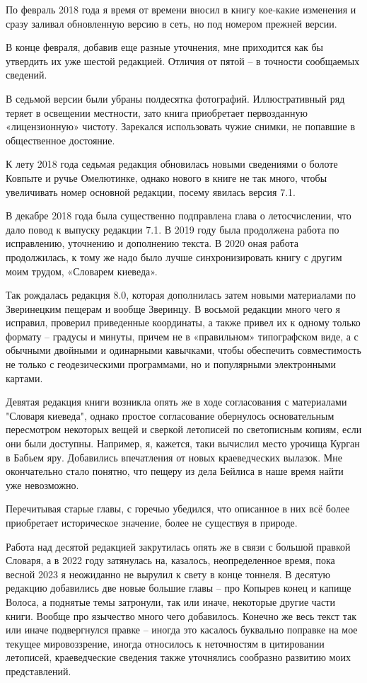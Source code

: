 По февраль 2018 года я время от времени вносил в книгу кое-какие изменения и сразу заливал обновленную версию в сеть, но под номером прежней версии.

В конце февраля, добавив еще разные уточнения, мне приходится как бы утвердить их уже шестой редакцией. Отличия от пятой – в точности сообщаемых сведений. 

В седьмой версии были убраны полдесятка фотографий. Иллюстративный ряд теряет в освещении местности, зато книга приобретает первозданную «лицензионную» чистоту. Зарекался использовать чужие снимки, не попавшие в общественное достояние.

К лету 2018 года седьмая редакция обновилась новыми сведениями о болоте Ковпыте и ручье Омелютинке, однако нового в книге не так много, чтобы увеличивать номер основной редакции, посему явилась версия 7.1.

В декабре 2018 года была существенно подправлена глава о летосчислении, что дало повод к выпуску редакции 7.1. В 2019 году была продолжена работа по исправлению, уточнению и дополнению текста. В 2020 оная работа продолжилась, к тому же надо было лучше синхронизировать книгу с другим моим трудом, «Словарем киеведа». 

Так рождалась редакция 8.0, которая дополнилась затем новыми материалами по Зверинецким пещерам и вообще Зверинцу. В восьмой редакции много чего я исправил, проверил приведенные координаты, а также привел их к одному только формату – градусы и минуты, причем не в «правильном» типографском виде, а с обычными двойными и одинарными кавычками, чтобы обеспечить совместимость не только с геодезическими программами, но и популярными электронными картами. 

Девятая редакция книги возникла опять же в ходе согласования с материалами "Словаря киеведа", однако простое согласование обернулось основательным пересмотром некоторых вещей и сверкой летописей по светописным копиям, если они были доступны. Например, я, кажется, таки вычислил место урочища Курган в Бабьем яру. Добавились впечатления от новых краеведческих вылазок. Мне окончательно стало понятно, что пещеру из дела Бейлиса в наше время найти уже невозможно.

Перечитывая старые главы, с горечью убедился, что описанное в них всё более приобретает историческое значение, более не существуя в природе.

Работа над десятой редакцией закрутилась опять же в связи с большой правкой Словаря, а в 2022 году затянулась на, казалось, неопределенное время, пока весной 2023 я неожиданно не вырулил к свету в конце тоннеля. В десятую редакцию добавились две новые большие главы – про Копырев конец и капище Волоса, а поднятые темы затронули, так или иначе, некоторые другие части книги. Вообще про язычество много чего добавилось. Конечно же весь текст так или иначе подвергнулся правке – иногда это касалось буквально поправке на мое текущее мировоззрение, иногда относилось к неточностям в цитировании летописей, краеведческие сведения также уточнялись сообразно развитию моих представлений.

